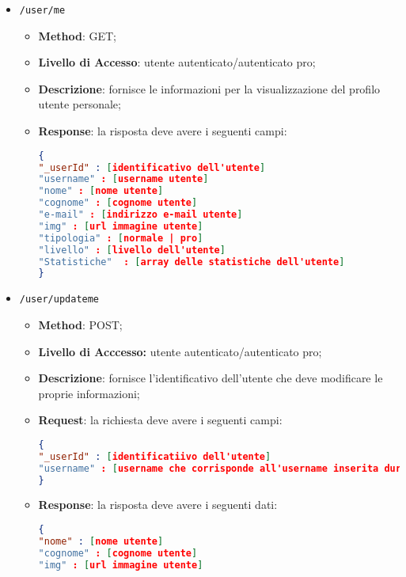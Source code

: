 \begin{itemize}
\begin{itemize}
		\item \textbf{Response:} la risposta deve avere i seguenti campi:
\begin{lstlisting}[language=json,firstnumber=1]
{
"result" : [array di oggeti che contengono l'username e l'identificativo degli utenti trovati]
}
\end{lstlisting}
	 \end{itemize}
	\item \texttt{/user/me}
		\begin{itemize}
			\item \textbf{Method}: GET;
			\item \textbf{Livello di Accesso}: utente autenticato/autenticato pro;
			\item \textbf{Descrizione}: fornisce le informazioni per la visualizzazione del profilo utente personale;
			\item \textbf{Response}: la risposta deve avere i seguenti campi:
\begin{lstlisting}[language=json,firstnumber=1]
{
"_userId" : [identificativo dell'utente]
"username" : [username utente]
"nome" : [nome utente]
"cognome" : [cognome utente]
"e-mail" : [indirizzo e-mail utente]
"img" : [url immagine utente]
"tipologia" : [normale | pro]
"livello" : [livello dell'utente]
"Statistiche"  : [array delle statistiche dell'utente]
}
\end{lstlisting}
		\end{itemize}
	\item \texttt{/user/updateme}
		\begin{itemize}
			\item \textbf{Method}: POST;
			\item \textbf{Livello di Acccesso:} utente autenticato/autenticato pro;
			\item \textbf{Descrizione}: fornisce l'identificativo dell'utente che deve modificare le proprie informazioni;
			\item \textbf{Request}: la richiesta deve avere i seguenti campi:
\begin{lstlisting}[language=json,firstnumber=1]
{
"_userId" : [identificatiivo dell'utente]
"username" : [username che corrisponde all'username inserita durante la registrazione]
}
\end{lstlisting}
			\item \textbf{Response}: la risposta deve avere i seguenti dati:
\begin{lstlisting}[language=json,firstnumber=1]
{
"nome" : [nome utente]
"cognome" : [cognome utente]
"img" : [url immagine utente]

\end{lstlisting}
\end{itemize}
\end{itemize}
